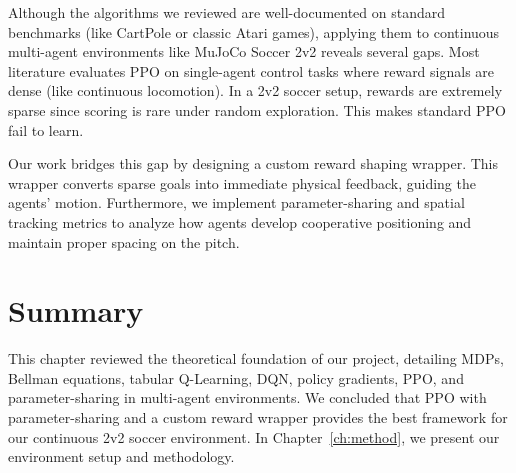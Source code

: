 Although the algorithms we reviewed are well-documented on standard benchmarks (like CartPole or classic Atari games), applying them to continuous multi-agent environments like MuJoCo Soccer 2v2 reveals several gaps. Most literature evaluates PPO on single-agent control tasks where reward signals are dense (like continuous locomotion). In a 2v2 soccer setup, rewards are extremely sparse since scoring is rare under random exploration. This makes standard PPO fail to learn. 

Our work bridges this gap by designing a custom reward shaping wrapper. This wrapper converts sparse goals into immediate physical feedback, guiding the agents' motion. Furthermore, we implement parameter-sharing and spatial tracking metrics to analyze how agents develop cooperative positioning and maintain proper spacing on the pitch.

\section{Summary}
\label{sec:lit_summary}

This chapter reviewed the theoretical foundation of our project, detailing MDPs, Bellman equations, tabular Q-Learning, DQN, policy gradients, PPO, and parameter-sharing in multi-agent environments. We concluded that PPO with parameter-sharing and a custom reward wrapper provides the best framework for our continuous 2v2 soccer environment. In Chapter~\ref{ch:method}, we present our environment setup and methodology.